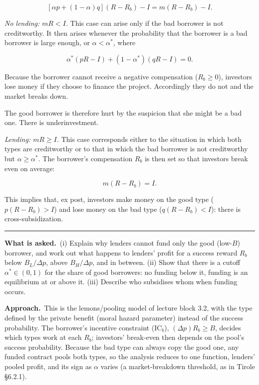 \documentclass[11pt,a4paper]{article}
\newcommand{\asked}{\par\medskip\noindent\textbf{What is asked.}~}
\newcommand{\approach}{\par\smallskip\noindent\textbf{Approach.}~}
\newcommand{\stmtend}{\par\endgroup\nopagebreak\noindent\rule{\linewidth}{0.4pt}\par\medskip}
\begin{document}
\[[\alpha p + (1 - \alpha) q](R - R_b) - I = m(R - R_b) - I.\]

\emph{No lending: \(mR < I\).} This case can arise only if the bad borrower is not creditworthy. It
then arises whenever the probability that the borrower is a bad borrower is large enough, or
\(\alpha < \alpha^*\), where

\[\alpha^*(pR - I) + (1 - \alpha^*)(qR - I) = 0.\]

Because the borrower cannot receive a negative compensation (\(R_b \geqslant 0\)), investors lose
money if they choose to finance the project. Accordingly they do not and the market breaks down.

The good borrower is therefore hurt by the suspicion that she might be a bad one. There is
underinvestment.

\emph{Lending: \(mR \geqslant I\).} This case corresponds either to the situation in which both
types are creditworthy or to that in which the bad borrower is not creditworthy but
\(\alpha \geqslant \alpha^*\). The borrower's compensation \(R_b\) is then set so that investors
break even on average:

\[m(R - R_b) = I.\]

This implies that, ex post, investors make money on the good type (\(p(R - R_b) > I\)) and lose
money on the bad type (\(q(R - R_b) < I\)): there is cross-subsidization.
\stmtend

\asked (i) Explain why lenders cannot fund only the good (low-$B$) borrower, and work out what happens to lenders' profit for a success reward $R_b$ below $B_L/\Delta p$, above $B_H/\Delta p$, and in between. (ii) Show that there is a cutoff $\alpha^*\in(0,1)$ for the share of good borrowers: no funding below it, funding is an equilibrium at or above it. (iii) Describe who subsidises whom when funding occurs.

\approach This is the lemons/pooling model of lecture block 3.2, with the type defined by the private benefit (moral hazard parameter) instead of the success probability. The borrower's incentive constraint (IC$_b$), $(\Delta p)R_b\ge B$, decides which types work at each $R_b$; investors' break-even then depends on the pool's success probability. Because the bad type can always copy the good one, any funded contract pools both types, so the analysis reduces to one function, lenders' pooled profit, and its sign as $\alpha$ varies (a market-breakdown threshold, as in Tirole \S6.2.1).
\end{document}

